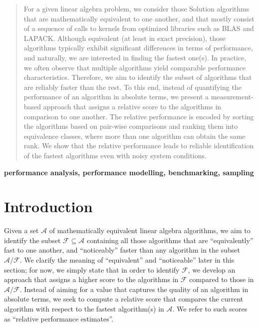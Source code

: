 \documentclass[conference]{IEEEtran}
\begin{document}
\begin{abstract}

  For a given linear algebra problem, we consider those Solution algorithms that are mathematically equivalent to one
  another, and that mostly consist of a sequence of calls to kernels from optimized libraries such as BLAS and
  LAPACK. Although equivalent (at least in exact precision), those algorithms typically exhibit significant differences
  in terms of performance, and naturally, we are interested in finding the fastest one(s). In practice, we often observe
  that multiple algorithms yield comparable performance characteristics. Therefore, we aim to identify the subset of algorithms that are reliably faster than the rest. To this end, instead of quantifying the performance of an
  algorithm in absolute terms, we present a measurement-based approach that assigns a relative score to the algorithms
  in comparison to one another. The relative performance is encoded by sorting the algorithms based on pair-wise
  comparisons and ranking them into equivalence classes, where more than one algorithm can obtain the same rank. We show
  that the relative performance leads to reliable identification of the fastest algorithms even with noisy system
  conditions.
  \\[4mm]


\end{abstract}

\begin{IEEEkeywords}
\textbf{performance analysis, performance modelling, benchmarking, sampling}
\end{IEEEkeywords}


\section{Introduction}


Given a set $\mathcal{A}$ of mathematically equivalent linear algebra algorithms, we aim to identify the subset
$\mathcal{F} \subseteq \mathcal{A}$ containing all those algorithms that are ``equivalently'' fast to one another, and
``noticeably'' faster than any algorithm in the subset $\mathcal{A}/\mathcal{F}$. We clarify the meaning of ``equivalent'' and
``noticeable'' later in this section; for now, we simply state that in order to identify $\mathcal{F}$, 
we develop an approach that assigns a higher score to the algorithms in
$\mathcal{F}$ compared to those in $\mathcal{A}/\mathcal{F}$. Instead of aiming for a value that captures the quality of an algorithm in absolute terms, we seek to compute a relative score that compares the current algorithm with respect to the fastest algorithm(s) in $\mathcal{A}$. We refer to such scores as ``relative performance estimates''.
\end{document}
